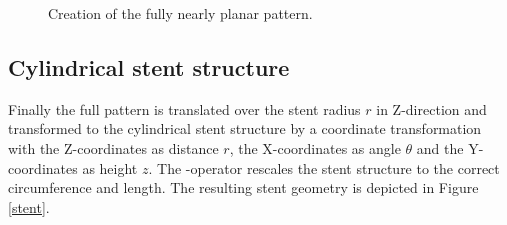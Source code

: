 \begin{figure} [ht]
\begin{latexonly}
\begin{minipage} [c] [] [c] {5.5cm}
	\begin{center}
	\vspace{-3ex}
	\vspace{1ex}
	\end{center}
\end{minipage}
\hspace{0.3cm}
   \end{latexonly}
   \begin{htmlonly}
   \end{htmlonly} 
	\caption {Creation of the fully nearly planar pattern.} 
	\label{plane}	
\end{figure}

\subsection{Cylindrical stent structure}

Finally the full pattern is translated over the stent radius $r$ in Z-direction and transformed to the cylindrical stent structure by a coordinate transformation with the Z-coordinates as distance $r$, the X-coordinates as angle $\theta$ and the Y-coordinates as height $z$. The -operator rescales the stent structure to the correct circumference and length. The resulting stent geometry is depicted in Figure \ref{stent}.
%


